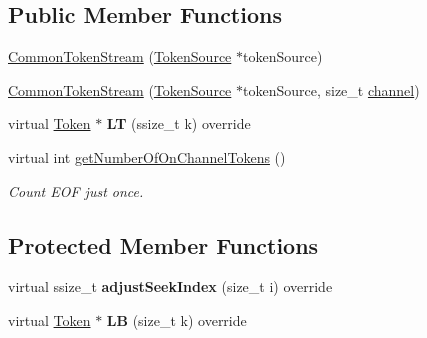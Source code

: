 \subsection*{Public Member Functions}
\begin{DoxyCompactItemize}
\item 
\hyperlink{classantlr4_1_1CommonTokenStream_a70ef318ad41bc2f99f44549027f886e1}{Common\+Token\+Stream} (\hyperlink{classantlr4_1_1TokenSource}{Token\+Source} $\ast$token\+Source)
\item 
\hyperlink{classantlr4_1_1CommonTokenStream_a3565e4d1910fb5e13b49d6a1f12e5cd7}{Common\+Token\+Stream} (\hyperlink{classantlr4_1_1TokenSource}{Token\+Source} $\ast$token\+Source, size\+\_\+t \hyperlink{classantlr4_1_1CommonTokenStream_aad59d04a125961d8ba1cffdf4a1a0bcf}{channel})
\item 
\mbox{\label{classantlr4_1_1CommonTokenStream_ab92b8381589e1a5aacf6e7ffdcf89dfc}} 
virtual \hyperlink{classantlr4_1_1Token}{Token} $\ast$ {\bfseries LT} (ssize\+\_\+t k) override
\item 
\mbox{\label{classantlr4_1_1CommonTokenStream_aafecb98aeb51496b59bc3bb19e228128}} 
virtual int \hyperlink{classantlr4_1_1CommonTokenStream_aafecb98aeb51496b59bc3bb19e228128}{get\+Number\+Of\+On\+Channel\+Tokens} ()
\begin{DoxyCompactList}\small\item\em Count E\+OF just once. \end{DoxyCompactList}\end{DoxyCompactItemize}
\subsection*{Protected Member Functions}
\begin{DoxyCompactItemize}
\item 
\mbox{\label{classantlr4_1_1CommonTokenStream_a5b8a9ff0beab08b379df20c5306b98cc}} 
virtual ssize\+\_\+t {\bfseries adjust\+Seek\+Index} (size\+\_\+t i) override
\item 
\mbox{\label{classantlr4_1_1CommonTokenStream_a2efe72e48498674a5db9d664aaea9d65}} 
virtual \hyperlink{classantlr4_1_1Token}{Token} $\ast$ {\bfseries LB} (size\+\_\+t k) override
\end{DoxyCompactItemize}
